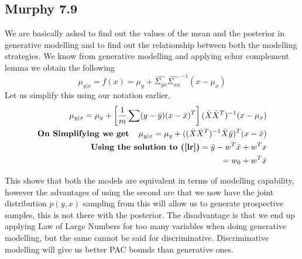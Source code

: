 \subsection{Murphy 7.9}
We are basically asked to find out the values of the mean and the posterior in generative modelling 
and to find out the relationship between both the modelling strategies.
We know from generative modelling and applying schur complement lemma we obtain the following
$$
\mu_{y|x} = f(x) = \mu_y + \hat{\Sigma_{yx}}\hat{\Sigma_{xx}}^{-1}(x - \mu_x)
$$
Let us simplify this using our notation earlier,
\begin{align}
    \mu_{y|x} = \mu_y + \left[\frac{1}{m} \sum( y - \bar{y} )( x - \bar{x})^T \right](\bar{X}\bar{X}^T)^{-1} (x - \mu_x) 
    \\
    \textbf{On Simplifying we get \ \ }
    \mu_{y|x} = \mu_y + ((\bar{X}\bar{X}^T)^{-1} \bar{X}\bar{y})^T (x - \bar{x})
    \\
    \textbf{Using the solution to (\ref{lr})} = \bar{y}  - w^T\bar{x} + w^Tx 
     \\
     = w_0 + w^T\bar{x}
\end{align}

This shows that both the models are equivalent in terms of modelling capability, 
however the advantages of using the second are that we now have the joint distribution $p(y, x)
$ sampling from this will allow us to generate prospective samples, this is not there with the posterior.
The disadvantage is that we end up applying Law of Large Numbers for too many variables when doing generative modelling,
but the same cannot be said for discriminative. Discriminative modelling will give us better PAC bounds than generative ones.